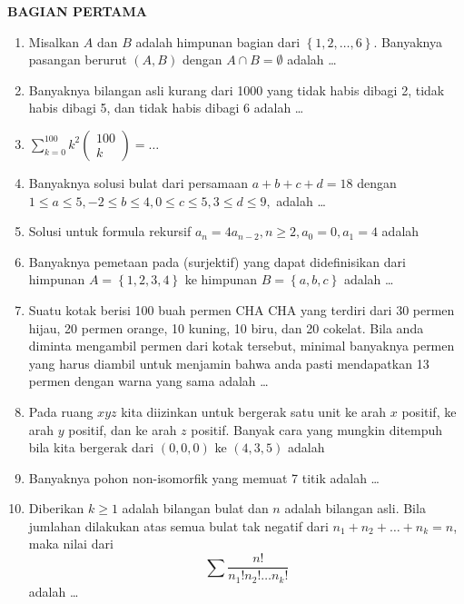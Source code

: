 \documentclass[12pt,twoside]{article}
\begin{document}
\textbf{BAGIAN PERTAMA}
\begin{enumerate}
	\item Misalkan $A$ dan $B$ adalah himpunan bagian dari $\left\lbrace 1,2,\dots,6\right\rbrace$. Banyaknya pasangan berurut $(A,B)$ dengan $A \cap B = \emptyset$ adalah \dots

	\item Banyaknya bilangan asli kurang dari 1000 yang tidak habis dibagi 2, tidak habis dibagi 5, dan tidak habis dibagi 6 adalah \dots

	\item $\displaystyle\sum_{k = 0}^{100} k^2 \left( \begin{array}{c}
				      100 \\k
			      \end{array} \right) = \dots$

	\item Banyaknya solusi bulat dari persamaan $a+b+c+d = 18$ dengan $1 \leq a \leq 5 , -2 \leq b \leq 4, 0 \leq c \leq 5, 3 \leq d \leq 9, $ adalah \dots

	\item Solusi untuk formula rekursif $a_n = 4a_{n-2}, n \geq 2, a_0 =0, a_1 = 4$ adalah

	\item Banyaknya pemetaan pada (surjektif) yang dapat didefinisikan dari himpunan $A=\left\lbrace 1,2,3,4 \right\rbrace$ ke himpunan $B = \left\lbrace a,b,c \right\rbrace$ adalah \dots

	\item Suatu kotak berisi 100 buah permen CHA CHA yang terdiri dari 30 permen hijau, 20 permen orange, 10 kuning, 10 biru, dan 20 cokelat. Bila anda diminta mengambil permen dari kotak tersebut, minimal banyaknya permen yang harus diambil untuk menjamin bahwa anda pasti mendapatkan 13 permen dengan warna yang sama adalah \dots

	\item Pada ruang $xyz$ kita diizinkan untuk bergerak satu unit ke arah $x$ positif, ke arah $y$ positif, dan ke arah $z$ positif. Banyak cara yang mungkin ditempuh bila kita bergerak dari $(0,0,0)$ ke $(4,3,5)$ adalah

	\item Banyaknya pohon non-isomorfik yang memuat 7 titik adalah \dots

	\item Diberikan $k \geq 1$ adalah bilangan bulat dan $n$ adalah bilangan asli. Bila jumlahan dilakukan atas semua bulat tak negatif dari $n_1 + n_2 +\dots+ n_k = n$, maka nilai dari
	      \begin{equation*}
		      \displaystyle\sum \dfrac{n!}{n_1!n_2!\dots n_k!}
	      \end{equation*}
	      adalah  \dots

\end{enumerate}
\end{document}
